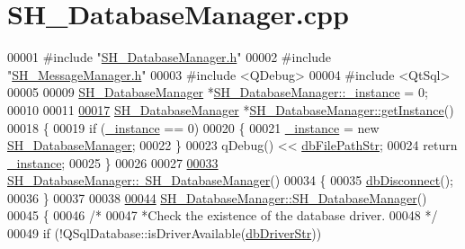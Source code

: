 \hypertarget{SH__DatabaseManager_8cpp_source}{\section{S\-H\-\_\-\-Database\-Manager.\-cpp}
}

\begin{DoxyCode}
00001 \textcolor{preprocessor}{#include "\hyperlink{SH__DatabaseManager_8h}{SH\_DatabaseManager.h}"}
00002 \textcolor{preprocessor}{#include "\hyperlink{SH__MessageManager_8h}{SH\_MessageManager.h}"}
00003 \textcolor{preprocessor}{#include <QDebug>}
00004 \textcolor{preprocessor}{#include <QtSql>}
00005 
00009 \hyperlink{classSH__DatabaseManager}{SH\_DatabaseManager} *\hyperlink{classSH__DatabaseManager_a8ca37d0cafa6a181582d60e045a8d5ab}{SH\_DatabaseManager::\_instance} = 0;
00010 
00011 
\hypertarget{SH__DatabaseManager_8cpp_source_l00017}{}\hyperlink{classSH__DatabaseManager_a638369a15265ab0aa053080a32d2ca39}{00017} \hyperlink{classSH__DatabaseManager}{SH\_DatabaseManager} *\hyperlink{classSH__DatabaseManager_a638369a15265ab0aa053080a32d2ca39}{SH\_DatabaseManager::getInstance}()
00018 \{
00019     \textcolor{keywordflow}{if} (\hyperlink{classSH__DatabaseManager_a8ca37d0cafa6a181582d60e045a8d5ab}{\_instance} == 0)
00020     \{
00021         \hyperlink{classSH__DatabaseManager_a8ca37d0cafa6a181582d60e045a8d5ab}{\_instance} = \textcolor{keyword}{new} \hyperlink{classSH__DatabaseManager_a7b5d0e372c153eb59cdab98588994904}{SH\_DatabaseManager};
00022     \}
00023     qDebug() << \hyperlink{SH__DatabaseManager_8h_acee79beb6e5aec996fd46b84264d072a}{dbFilePathStr};
00024     \textcolor{keywordflow}{return} \hyperlink{classSH__DatabaseManager_a8ca37d0cafa6a181582d60e045a8d5ab}{\_instance};
00025 \}
00026 
00027 
\hypertarget{SH__DatabaseManager_8cpp_source_l00033}{}\hyperlink{classSH__DatabaseManager_ad899140e4638301b6a6ed68a3289b34b}{00033} \hyperlink{classSH__DatabaseManager_ad899140e4638301b6a6ed68a3289b34b}{SH\_DatabaseManager::~SH\_DatabaseManager}()
00034 \{
00035     \hyperlink{classSH__DatabaseManager_a3716cf1a5f521cc49584dbcb2fab28bf}{dbDisconnect}();
00036 \}
00037 
00038 
\hypertarget{SH__DatabaseManager_8cpp_source_l00044}{}\hyperlink{classSH__DatabaseManager_a7b5d0e372c153eb59cdab98588994904}{00044} \hyperlink{classSH__DatabaseManager_a7b5d0e372c153eb59cdab98588994904}{SH\_DatabaseManager::SH\_DatabaseManager}()
00045 \{
00046     \textcolor{comment}{/*}
00047 \textcolor{comment}{     *Check the existence of the database driver.}
00048 \textcolor{comment}{     */}
00049     \textcolor{keywordflow}{if} (!QSqlDatabase::isDriverAvailable(\hyperlink{SH__DatabaseManager_8h_a867ada6d1926e2ded0e68678e02a19c7}{dbDriverStr}))

\end{DoxyCode}
